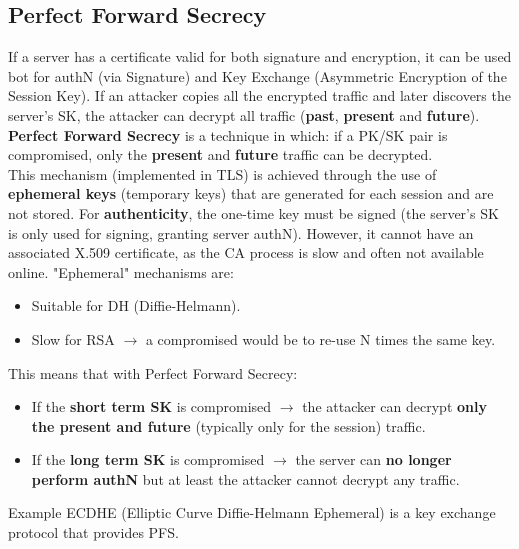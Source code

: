 \subsection{Perfect Forward Secrecy}
If a server has a certificate valid for both signature and encryption, it can be used bot for authN (via Signature) and Key Exchange (Asymmetric Encryption of the Session Key). If an attacker copies all the encrypted traffic and later discovers the server's SK, the attacker can decrypt all traffic (\textbf{past}, \textbf{present} and \textbf{future}).\\
\textbf{Perfect Forward Secrecy} is a technique in which: if a PK/SK pair is compromised, only the \textbf{present} and \textbf{future} traffic can be decrypted.\\
This mechanism (implemented in TLS) is achieved through the use of \textbf{ephemeral keys} (temporary keys) that are generated for each session and are not stored. For \textbf{authenticity}, the one-time key must be signed (the server’s SK is only used for signing, granting server authN). However, it cannot have an associated X.509 certificate, as the CA process is slow and often not available online. "Ephemeral" mechanisms are:
\begin{itemize}
    \item Suitable for DH (Diffie-Helmann).
    \item Slow for RSA \(\rightarrow\) a compromised would be to re-use N times the same key. 
\end{itemize}
This means that with Perfect Forward Secrecy:
\begin{itemize}
    \item If the \textbf{short term SK} is compromised \(\rightarrow\) the attacker can decrypt \textbf{only the present and future} (typically only for the session) traffic.
    \item If the \textbf{long term SK} is compromised \(\rightarrow\) the server can \textbf{no longer perform authN} but at least the attacker cannot decrypt any traffic. 
\end{itemize}
\begin{quotebox-grey}{Example}
ECDHE (Elliptic Curve Diffie-Helmann Ephemeral) is a key exchange protocol that provides PFS.
\end{quotebox-grey}

